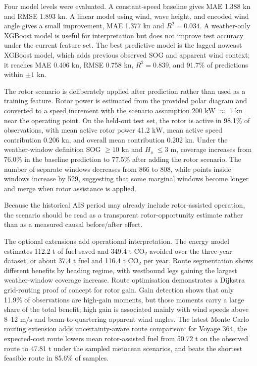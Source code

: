 \documentclass[10pt,a4paper]{article}
\newcommand{\kn}{\ensuremath{\mathrm{kn}}}
\newcommand{\ms}{\ensuremath{\mathrm{m/s}}}
\newcommand{\kw}{\ensuremath{\mathrm{kW}}}
\newcommand{\co}{CO$_2$}
\newcommand{\hs}{$H_s$}
\newcommand{\sog}{SOG}
\begin{document}
Four model levels were evaluated. A constant-speed baseline gives MAE
1.388 \kn{} and RMSE 1.893 \kn{}. A linear model using wind, wave height, and
encoded wind angle gives a small improvement, MAE 1.377 \kn{} and $R^2=0.034$.
A weather-only XGBoost model is useful for interpretation but does not improve
test accuracy under the current feature set. The best predictive model is the
lagged nowcast XGBoost model, which adds previous observed \sog{} and apparent
wind context; it reaches MAE 0.406 \kn{}, RMSE 0.758 \kn{}, $R^2=0.839$, and
91.7\% of predictions within $\pm 1$ \kn{}.

The rotor scenario is deliberately applied after prediction rather than used as
a training feature. Rotor power is estimated from the provided polar diagram and
converted to a speed increment with the scenario assumption
200 \kw{} $\approx$ 1 \kn{} near the operating point. On the held-out test set,
the rotor is active in 98.1\% of observations, with mean active rotor power
41.2 \kw{}, mean active speed contribution 0.206 \kn{}, and overall mean
contribution 0.202 \kn{}. Under the weather-window definition
\sog{} $\geq 10$ \kn{} and \hs{} $\leq 3$ m, coverage increases from 76.0\% in
the baseline prediction to 77.5\% after adding the rotor scenario. The number
of separate windows decreases from 866 to 808, while points inside windows
increase by 529, suggesting that some marginal windows become longer and merge
when rotor assistance is applied.

Because the historical AIS period may already include rotor-assisted operation,
the scenario should be read as a transparent rotor-opportunity estimate rather
than as a measured causal before/after effect.

The optional extensions add operational interpretation. The energy model
estimates 112.2 t of fuel saved and 349.4 t \co{} avoided over the three-year
dataset, or about 37.4 t fuel and 116.4 t \co{} per year. Route segmentation
shows different benefits by heading regime, with westbound legs gaining the
largest weather-window coverage increase. Route optimisation demonstrates a
Dijkstra grid-routing proof of concept for rotor gain. Gain detection shows that
only 11.9\% of observations are high-gain moments, but those moments carry a
large share of the total benefit; high gain is associated mainly with wind
speeds above 8--12 \ms{} and beam-to-quartering apparent wind angles. The latest
Monte Carlo routing extension adds uncertainty-aware route comparison: for
Voyage 364, the expected-cost route lowers mean rotor-assisted fuel from
50.72 t on the observed route to 47.81 t under the sampled metocean scenarios,
and beats the shortest feasible route in 85.6\% of samples.
\end{document}
